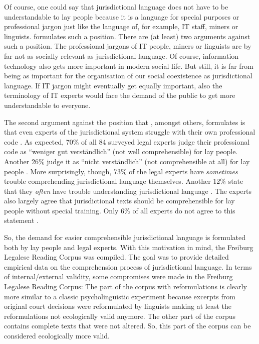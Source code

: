\documentclass[output=paper]{langsci/langscibook}
\begin{document}
Of course, one could say that jurisdictional language does not have to be understandable to lay people because it is a language for special purposes or professional jargon just like the language of, for example, IT staff, miners or linguists. \citet{Towfigh2009} formulates such a position. There are (at least) two arguments against such a position. The professional jargons of IT people, miners or linguists are by far not as socially relevant as jurisdictional language. Of course, information technology also gets more important in modern social life. But still, it is far from being as important for the organisation of our social coexistence as jurisdictional language. If IT jargon might eventually get equally important, also the terminology of IT experts would face the demand of the public to get more understandable to everyone.

\newpage 
The second argument against the position that \citet{Towfigh2009}, amongst others, formulates is that even experts of the jurisdictional system struggle with their own professional code \citep[cf. ][]{eichhoff2009einstellungen}. As expected, 70\% of all 84 surveyed legal experts judge their professional code as ``weniger gut verständlich'' (not well comprehensible) for lay people. Another 26\% judge it as ``nicht verständlich'' (not comprehensible at all) for lay people \citep[138]{eichhoff2009einstellungen}. More surprisingly, though, 73\% of the legal experts have \textit{sometimes} trouble comprehending jurisdictional language themselves. Another 12\% state that they \textit{often} have trouble understanding jurisdictional language \citep[146]{eichhoff2009einstellungen}. The experts also largely agree that jurisdictional texts should be comprehensible for lay people without special training. Only 6\% of all experts do not agree to this statement \citep[139]{eichhoff2009einstellungen}.

So, the demand for easier comprehensible jurisdictional language is formulated both by lay people and legal experts. With this motivation in mind, the Freiburg Legalese Reading Corpus was compiled. The goal was to provide detailed empirical data on the comprehension process of jurisdictional language. In terms of internal/external validity, some compromises were made in the Freiburg Legalese Reading Corpus: The part of the corpus with reformulations is clearly more similar to a classic psycholinguistic experiment because excerpts from original court decisions were reformulated by linguists making at least the reformulations not ecologically valid anymore. The other part of the corpus contains complete texts that were not altered. So, this part of the corpus can be considered ecologically more valid.
\end{document}
